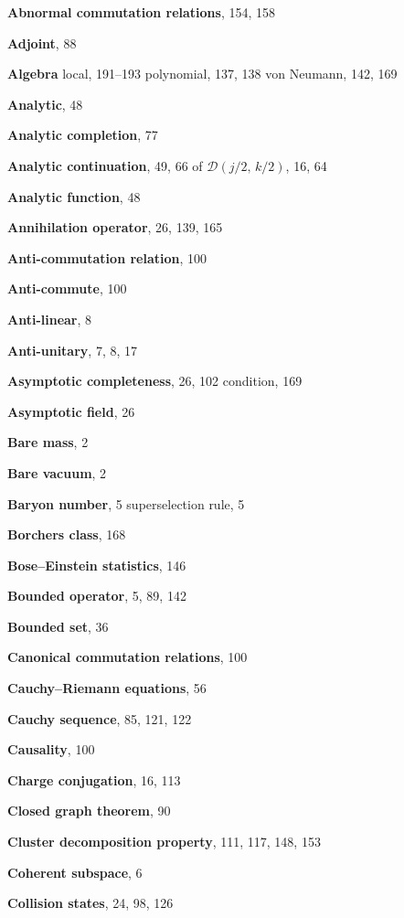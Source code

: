 \begingroup
\makeatletter
\def\ps@plain{%
  \renewcommand\@oddfoot{\hfill-- \thepage\ --\hfill}%
  \renewcommand\@oddhead{}%
}
\makeatother
\renewcommand{\indexname}{INDEX}
{}
\begin{theindex}
\small

\item \textbf{Abnormal commutation relations}, 154, 158
\item \textbf{Adjoint}, 88
\item \textbf{Algebra}
\subitem local, 191--193
\subitem polynomial, 137, 138
\subitem von Neumann, 142, 169
\item \textbf{Analytic}, 48
\item \textbf{Analytic completion}, 77
\item \textbf{Analytic continuation}, 49, 66
\subitem of $\mathcal{D}(j/2,\,k/2)$, 16, 64
\item \textbf{Analytic function}, 48
\item \textbf{Annihilation operator}, 26, 139, 165
\item \textbf{Anti-commutation relation}, 100
\item \textbf{Anti-commute}, 100
\item \textbf{Anti-linear}, 8
\item \textbf{Anti-unitary}, 7, 8, 17
\item \textbf{Asymptotic completeness}, 26, 102
\subitem condition, 169
\item \textbf{Asymptotic field}, 26

\indexspace
\item \textbf{Bare mass}, 2
\item \textbf{Bare vacuum}, 2
\item \textbf{Baryon number}, 5
\subitem superselection rule, 5
\item \textbf{Borchers class}, 168
\item \textbf{Bose--Einstein statistics}, 146
\item \textbf{Bounded operator}, 5, 89, 142
\item \textbf{Bounded set}, 36

\indexspace
\item \textbf{Canonical commutation relations}, 100
\item \textbf{Cauchy--Riemann equations}, 56
\item \textbf{Cauchy sequence}, 85, 121, 122
\item \textbf{Causality}, 100
\item \textbf{Charge conjugation}, 16, 113
\item \textbf{Closed graph theorem}, 90
\item \textbf{Cluster decomposition property}, 111, 117, 148, 153
\item \textbf{Coherent subspace}, 6
\item \textbf{Collision states}, 24, 98, 126


\end{theindex}

